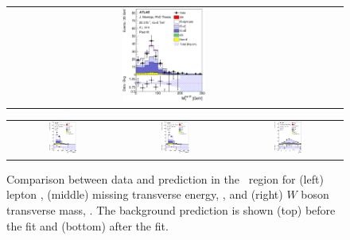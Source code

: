 \begin{figure}[tp]
\begin{tabular}{ccc}
  \includegraphics[width=0.27\textwidth]{Analysis/Figures_ttH/tesis_vars/postfit/WlepMT_4jetex4btagin.eps} \\
\end{tabular}
\caption{Comparison between data and prediction in the \fourfour\ region for (left) lepton \pt,  (middle) missing transverse energy, \met, and (right)  $W$ boson transverse mass, \mtw. The background prediction is shown (top) before the fit and (bottom) after the fit.}
  \label{fig:vars1_fourfour}
\vspace{0.5cm}
  \centering
  \begin{tabular}{ccc}
  \includegraphics[width=0.27\textwidth]{Analysis/Figures_ttH/tesis_vars/prefit/jet1_pt_4jetex4btagin.eps} &
  \includegraphics[width=0.27\textwidth]{Analysis/Figures_ttH/tesis_vars/prefit/bjet1_pt_4jetex4btagin.eps} &
  \includegraphics[width=0.27\textwidth]{Analysis/Figures_ttH/tesis_vars/prefit/lep_eta_4jetex4btagin.eps} \\

\end{tabular}
\end{figure}
